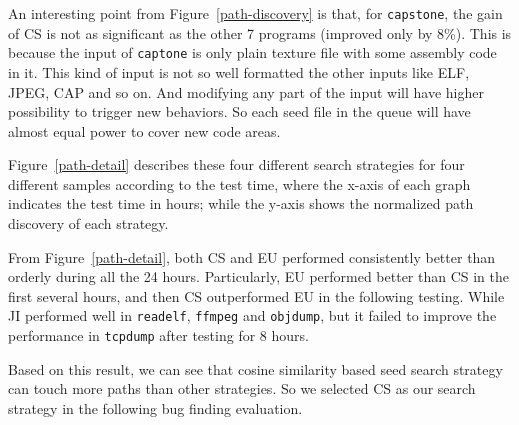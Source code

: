 An interesting point from Figure~\ref{path-discovery} is that, for \texttt{capstone}, the gain of CS is not as significant as the other 7 programs (improved only by 8\%). This is because the input of \texttt{captone} is only plain texture file with some assembly code in it. This kind of input is not so well formatted the other inputs like ELF, JPEG, CAP and so on. And modifying any part of the input will have higher possibility to trigger new behaviors. So each seed file in the queue will have almost equal power to cover new code areas. 

Figure~\ref{path-detail} describes these four different search strategies for four different samples according to the test time, where the x-axis of each graph indicates the test time in hours; while the y-axis shows the normalized path discovery of each strategy.

From Figure~\ref{path-detail}, both CS and EU performed consistently better than orderly during all the 24 hours. Particularly, EU performed better than CS in the first several hours, and then CS outperformed EU in the following testing. While JI performed well in \texttt{readelf}, \texttt{ffmpeg} and \texttt{objdump}, but it failed to improve the performance in \texttt{tcpdump} after testing for 8 hours.

Based on this result, we can see that cosine similarity based seed search strategy can touch more paths than other strategies. So we selected CS as our search strategy in the following bug finding evaluation.

